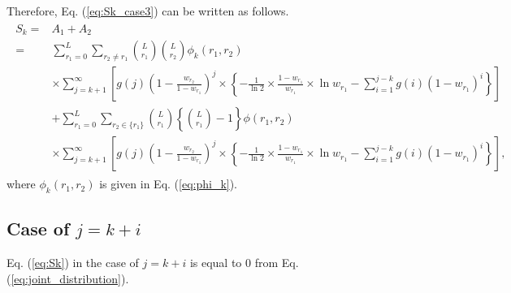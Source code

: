 %
Therefore, Eq. (\ref{eq:Sk_case3}) can be written as follows.
\begin{align}\begin{split}
	S_k =& A_1 + A_2 \\
	=& \sum_{r_1=0}^{L} \sum_{r_2 \neq r_1} \binom{L}{r_1}\binom{L}{r_2}\phi_k(r_1,r_2)\\
	&\times\sum_{j=k+1}^{\infty} \left[ g(j) \left(1-\frac{w_{r_2}}{1-w_{r_1}} \right)^{j} \times \left\{ -\frac{1}{\ln 2} \times \frac{1-w_{r_1}}{w_{r_1}} \times \ln w_{r_1} - \sum_{i=1}^{j-k} g(i)(1-w_{r_1})^{i} \right\} \right] \\
	&+\sum_{r_1=0}^{L} \sum_{r_2 \in \{r_1\}} \binom{L}{r_1}\left\{\binom{L}{r_1}-1\right\} \phi(r_1,r_2) \\
	&\times\sum_{j=k+1}^{\infty} \left[ g(j) \left(1-\frac{w_{r_2}}{1-w_{r_1}} \right)^{j} \times \left\{ -\frac{1}{\ln 2} 
	\times \frac{1-w_{r_1}}{w_{r_1}} \times \ln w_{r_1} - \sum_{i=1}^{j-k} g(i)(1-w_{r_1})^{i} \right\} \right],
\end{split}\end{align}
where $\phi_k(r_1,r_2)$ is given in Eq. (\ref{eq:phi_k}).
\subsection{Case of $j=k+i$}
Eq. (\ref{eq:Sk}) in the case of $j=k+i$ is equal to $0$ from Eq. (\ref{eq:joint_distribution}).
